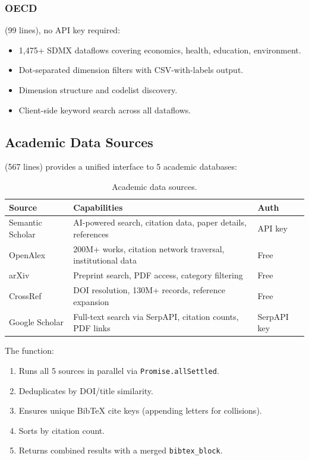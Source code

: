 \subsubsection{OECD}

 (99 lines), no API key required:

\begin{itemize}
  \item 1,475+ SDMX dataflows covering economics, health, education, environment.
  \item Dot-separated dimension filters with CSV-with-labels output.
  \item Dimension structure and codelist discovery.
  \item Client-side keyword search across all dataflows.
\end{itemize}

\subsection{Academic Data Sources}

 (567 lines) provides a unified interface to 5 academic databases:

\begin{table}[H]
\centering
\caption{Academic data sources.}
\label{tab:academic-sources}
\begin{tabularx}{\textwidth}{lXl}
\toprule
\textbf{Source} & \textbf{Capabilities} & \textbf{Auth} \\
\midrule
Semantic Scholar & AI-powered search, citation data, paper details, references & API key \\
OpenAlex & 200M+ works, citation network traversal, institutional data & Free \\
arXiv & Preprint search, PDF access, category filtering & Free \\
CrossRef & DOI resolution, 130M+ records, reference expansion & Free \\
Google Scholar & Full-text search via SerpAPI, citation counts, PDF links & SerpAPI key \\
\bottomrule
\end{tabularx}
\end{table}

The  function:
\begin{enumerate}
  \item Runs all 5 sources in parallel via \texttt{Promise.allSettled}.
  \item Deduplicates by DOI/title similarity.
  \item Ensures unique BibTeX cite keys (appending letters for collisions).
  \item Sorts by citation count.
  \item Returns combined results with a merged \texttt{bibtex\_block}.
\end{enumerate}


